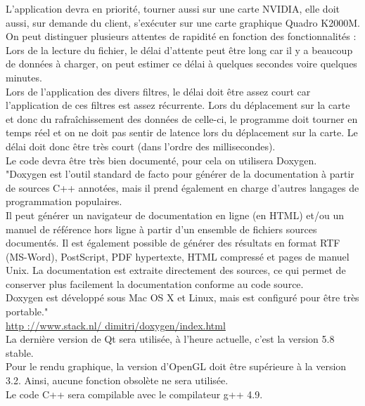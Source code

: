 \documentclass[12pt]{article}
\begin{document}
		L’application devra en priorité, tourner aussi sur une carte NVIDIA, elle doit aussi,
		sur demande du client, s’exécuter sur une carte graphique Quadro K2000M.\\
		
		On peut distinguer plusieurs attentes de rapidité en fonction des fonctionnalités :
		Lors de la lecture du fichier, le délai d’attente peut être long car il y a
		beaucoup de données à charger, on peut estimer ce délai à quelques secondes voire
		quelques minutes. \\
		
		Lors de l’application des divers filtres, le délai doit être assez court car 
		l'application de ces filtres est assez récurrente.
		Lors du déplacement sur la carte et donc du rafraîchissement des données de celle-ci,
		le programme doit tourner en temps réel et on ne doit pas sentir de latence lors du
		déplacement sur la carte. Le délai doit donc être très court (dans l’ordre des
		millisecondes).\\
		Le code devra être très bien documenté, pour cela on utilisera Doxygen.
		"Doxygen est l’outil standard de facto pour générer de la documentation à partir de
		sources C++ annotées, mais il prend également en charge d’autres langages de
		programmation populaires.\\
		Il peut générer un navigateur de documentation en ligne (en HTML) et/ou un manuel de
		référence hors ligne à partir d’un ensemble de fichiers sources documentés. Il est
		également possible de générer des résultats en format RTF (MS-Word), PostScript,
		PDF hypertexte, HTML compressé et pages de manuel Unix. La documentation est 
		extraite directement des sources, ce qui permet de conserver plus facilement
		la documentation conforme au code source. \\
		Doxygen est développé sous Mac OS X et Linux, mais est configuré pour être très
		portable."\\
		
		\url{http ://www.stack.nl/ dimitri/doxygen/index.html} \\
		
		La dernière version de Qt sera utilisée, à l’heure actuelle, c’est la version
		5.8 stable.\\
		Pour le rendu graphique, la version d’OpenGL doit être supérieure à la version 3.2.
		Ainsi, aucune fonction obsolète ne sera utilisée.\\
		Le code C++ sera compilable avec le compilateur g++ 4.9.
		
\end{document}
